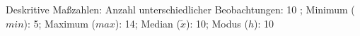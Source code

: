 				\label{tableValues:bsch04b_v1}
				\vspace*{-\baselineskip}
                    \begin{noten}
                	    \note{} Deskritive Maßzahlen:
                	    Anzahl unterschiedlicher Beobachtungen: 10%
                	    ; 
                	      Minimum ($min$): 5; 
                	      Maximum ($max$): 14; 
                	      Median ($\tilde{x}$): 10; 
                	      Modus ($h$): 10
                     \end{noten}


